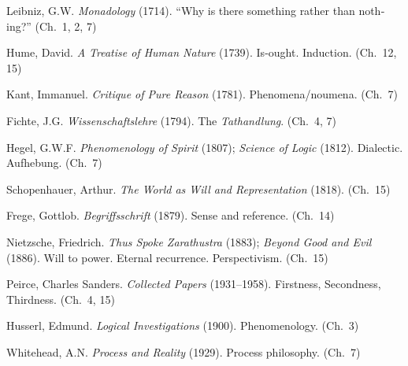 \documentclass[10pt, openany, oneside]{book}
\begin{document}
{\begin{english}
\noindent Leibniz, G.W. \textit{Monadology} (1714). ``Why is there something rather than nothing?'' (Ch.\ 1, 2, 7)

\vspace{0.3em}

\noindent Hume, David. \textit{A Treatise of Human Nature} (1739). Is-ought. Induction. (Ch.\ 12, 15)

\vspace{0.3em}

\noindent Kant, Immanuel. \textit{Critique of Pure Reason} (1781). Phenomena/noumena. (Ch.\ 7)

\vspace{0.3em}

\noindent Fichte, J.G. \textit{Wissenschaftslehre} (1794). The \textit{Tathandlung}. (Ch.\ 4, 7)

\vspace{0.3em}

\noindent Hegel, G.W.F. \textit{Phenomenology of Spirit} (1807); \textit{Science of Logic} (1812). Dialectic. Aufhebung. (Ch.\ 7)

\vspace{0.3em}

\noindent Schopenhauer, Arthur. \textit{The World as Will and Representation} (1818). (Ch.\ 15)

\vspace{0.3em}

\noindent Frege, Gottlob. \textit{Begriffsschrift} (1879). Sense and reference. (Ch.\ 14)

\vspace{0.3em}

\noindent Nietzsche, Friedrich. \textit{Thus Spoke Zarathustra} (1883); \textit{Beyond Good and Evil} (1886). Will to power. Eternal recurrence. Perspectivism. (Ch.\ 15)

\vspace{0.3em}

\noindent Peirce, Charles Sanders. \textit{Collected Papers} (1931--1958). Firstness, Secondness, Thirdness. (Ch.\ 4, 15)

\vspace{0.3em}

\noindent Husserl, Edmund. \textit{Logical Investigations} (1900). Phenomenology. (Ch.\ 3)

\vspace{0.3em}

\noindent Whitehead, A.N. \textit{Process and Reality} (1929). Process philosophy. (Ch.\ 7)


\end{english}}
\end{document}
